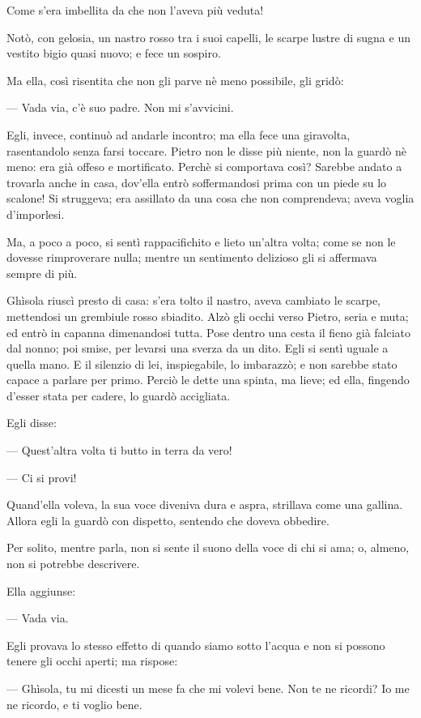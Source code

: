 Come s’era imbellita da che non l’aveva più veduta!

Notò, con gelosia, un nastro rosso tra i suoi capelli, le scarpe lustre di sugna e un vestito bigio quasi nuovo; e fece un sospiro.

Ma ella, così risentita che non gli parve nè meno possibile, gli gridò:

— Vada via, c’è suo padre. Non mi s’avvicini.

Egli, invece, continuò ad andarle incontro; ma ella fece una giravolta, rasentandolo senza farsi toccare. Pietro non le disse più niente, non la guardò nè meno: era già offeso e mortificato. Perchè si comportava così? Sarebbe andato a trovarla anche in casa, dov'ella entrò soffermandosi prima con un piede su lo scalone! Si struggeva; era assillato da una cosa che non comprendeva; aveva voglia d'imporlesi.

Ma, a poco a poco, si sentì rappacifichito e lieto un'altra volta; come se non le dovesse rimproverare nulla; mentre un sentimento delizioso gli si affermava sempre di più.

Ghìsola riuscì presto di casa: s'era tolto il nastro, aveva cambiato le scarpe, mettendosi un grembiule rosso sbiadito. Alzò gli occhi verso Pietro, seria e muta; ed entrò in capanna dimenandosi tutta. Pose dentro una cesta il fieno già falciato dal nonno; poi smise, per levarsi una sverza da un dito. Egli si sentì uguale a quella mano. E il silenzio di lei, inspiegabile, lo imbarazzò; e non sarebbe stato capace a parlare per primo. Perciò le dette una spinta, ma lieve; ed ella, fingendo d'esser stata per cadere, lo guardò accigliata.

Egli disse:

— Quest'altra volta ti butto in terra da vero!

— Ci si provi!

Quand'ella voleva, la sua voce diveniva dura e aspra, strillava come una gallina. Allora egli la guardò con dispetto, sentendo che doveva obbedire.

Per solito, mentre parla, non si sente il suono della voce di chi si ama; o, almeno, non si potrebbe descrivere.

Ella aggiunse:

— Vada via.

Egli provava lo stesso effetto di quando siamo sotto l'acqua e non si possono tenere gli occhi aperti; ma rispose:

— Ghìsola, tu mi dicesti un mese fa che mi volevi bene. Non te ne ricordi? Io me ne ricordo, e ti voglio bene.

